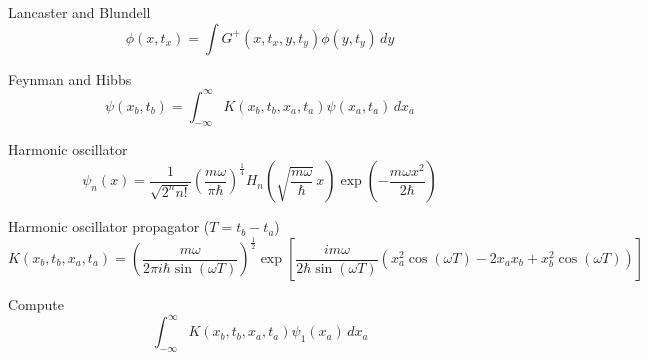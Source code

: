 

Lancaster and Blundell
\begin{equation*}
\phi(x,t_x)=\int G^+(x,t_x,y,t_y)\phi(y,t_y)\,dy
\end{equation*}

Feynman and Hibbs
\begin{equation*}
\psi(x_b,t_b)=\int_{-\infty}^\infty K(x_b,t_b,x_a,t_a)\psi(x_a,t_a)\,dx_a
\end{equation*}

Harmonic oscillator
\begin{equation*}
\psi_n(x)=\frac{1}{\sqrt{2^nn!}}\left(\frac{m\omega}{\pi\hbar}\right)^\frac{1}{4}
H_n\left(\sqrt{\frac{m\omega}{\hbar}}\,x\right)
\exp\left(-\frac{m\omega x^2}{2\hbar}\right)
\end{equation*}

Harmonic oscillator propagator ($T=t_b-t_a$)
\begin{equation*}
K(x_b,t_b,x_a,t_a)
=\left(\frac{m\omega}{2\pi i\hbar\sin(\omega T)}\right)^\frac{1}{2}
\exp\left[
\frac{im\omega}{2\hbar\sin(\omega T)}
\left(x_a^2\cos(\omega T)-2x_ax_b+x_b^2\cos(\omega T)\right)
\right]
\end{equation*}

Compute
\begin{equation*}
\int_{-\infty}^\infty K(x_b,t_b,x_a,t_a)\psi_1(x_a)\,dx_a
\end{equation*}

